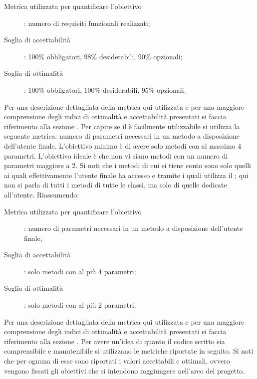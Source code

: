 					\begin{description}
						\item[Metrica utilizzata per quantificare l'obiettivo]: numero di requisiti funzionali realizzati;
						\item[Soglia di accettabilità]: 100\% obbligatori, 98\% desiderabili, 90\% opzionali;
						\item[Soglia di ottimalità]: 100\% obbligatori, 100\% desiderabili, 95\% opzionali.
					\end{description}
					Per una descrizione dettagliata della metrica qui utilizzata e per una maggiore comprensione degli indici di ottimalità e accettabilità presentati si faccia riferimento alla sezione .
					Per capire se il  è facilmente utilizzabile si utilizza la seguente metrica: numero di parametri necessari in un metodo a disposizione dell'utente finale. L'obiettivo minimo è di avere solo metodi con al massimo 4 parametri. L'obiettivo ideale è che non vi siano metodi con un numero di parametri maggiore a 2. Si noti che i metodi di cui si tiene conto sono solo quelli ai quali effettivamente l'utente finale ha accesso e tramite i quali utilizza il ; qui non si parla di tutti i metodi di tutte le classi, ma solo di quelle dedicate all'utente. Riassumendo:
					\begin{description}
						\item[Metrica utilizzata per quantificare l'obiettivo]: numero di parametri necessari in un metodo a disposizione dell'utente finale;
						\item[Soglia di accettabilità]: solo metodi con al più 4 parametri;
						\item[Soglia di ottimalità]: solo metodi con al più 2 parametri.
					\end{description}
					Per una descrizione dettagliata della metrica qui utilizzata e per una maggiore comprensione degli indici di ottimalità e accettabilità presentati si faccia riferimento alla sezione .
					Per avere un'idea di quanto il codice scritto sia comprensibile e manutenibile si utilizzano le metriche riportate in seguito. Si noti che per ognuna di esse sono riportati i valori accettabili e ottimali, ovvero vengono fissati gli obiettivi che si intendono raggiungere nell'arco del progetto.
